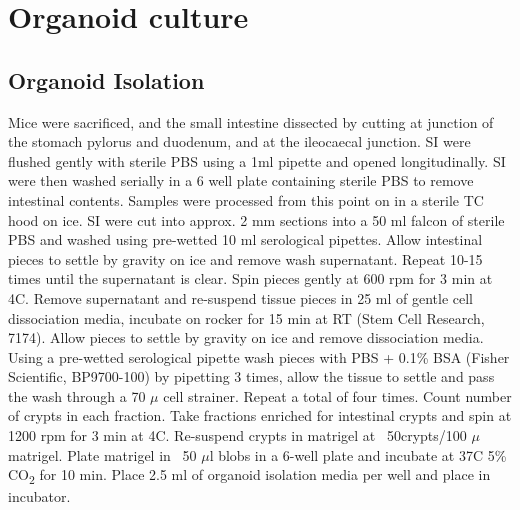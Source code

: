 \documentclass[a4paper]{report}
\begin{document}
\section{Organoid culture}
\subsection{Organoid Isolation}
Mice were sacrificed, and the small intestine dissected by cutting at junction of the stomach pylorus and duodenum, and at the ileocaecal junction. SI were flushed gently with sterile PBS using a 1ml pipette and opened longitudinally. SI were then washed serially in a 6 well plate containing sterile PBS to remove intestinal contents. Samples were processed from this point on in a sterile TC hood on ice. SI were cut into approx. 2 mm sections into a 50 ml falcon of sterile PBS and washed using pre-wetted 10 ml serological pipettes. Allow intestinal pieces to settle by gravity on ice and remove wash supernatant. Repeat 10-15 times until the supernatant is clear. Spin pieces gently at 600 rpm for 3 min at 4\textdegree{}C. Remove supernatant and re-suspend tissue pieces in 25 ml of gentle cell dissociation media, incubate on rocker for 15 min at RT (Stem Cell Research, 7174). Allow pieces to settle by gravity on ice and remove dissociation media. Using a pre-wetted serological pipette wash pieces with PBS + 0.1\% BSA (Fisher Scientific, BP9700-100) by pipetting 3 times, allow the tissue to settle and pass the wash through a 70 $\mu$ cell strainer. Repeat a total of four times. Count number of crypts in each fraction. Take fractions enriched for intestinal crypts and spin at 1200 rpm for 3 min at 4\textdegree{}C. Re-suspend crypts in matrigel at ~50crypts/100 $\mu$ matrigel. Plate matrigel in ~50 $\mu$l blobs in a 6-well plate and incubate at 37\textdegree{}C 5\% CO\textsubscript{2} for 10 min. Place 2.5 ml of organoid isolation media per well and place in incubator.
\nopagebreak
\end{document}
